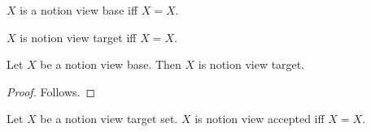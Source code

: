 \begin{definition}\label{notion_view_base}
    $X$ is a notion view base iff $X=X$.
\end{definition}

\begin{definition}\label{notion_view_target}
    $X$ is notion view target iff $X=X$.
\end{definition}

\begin{classification}\label{notion_view_registration}
    Let $X$ be a notion view base.
    Then $X$ is notion view target.
\end{classification}
\begin{proof}
    Follows.
\end{proof}

\begin{definition}\label{notion_view_accepted}
    Let $X$ be a notion view target set.
    $X$ is notion view accepted iff $X=X$.
\end{definition}
